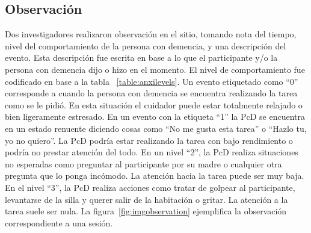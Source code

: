 	\subsection{Observaci\'on}
	Dos investigadores realizaron observaci\'on en el sitio, tomando nota del tiempo, nivel del comportamiento de la persona con demencia, y una descripci\'on del evento. Esta descripci\'on fue escrita en base a lo que el participante y/o la persona con demencia dijo o hizo en el momento. El nivel de comportamiento fue codificado en base a la tabla ~\ref{table:anxilevels}. Un evento etiquetado como ``0'' corresponde a cuando la persona con demencia se encuentra realizando la tarea como se le pidi\'o. En esta situaci\'on el cuidador puede estar totalmente relajado o bien ligeramente estresado. En un evento con la etiqueta ``1'' la PcD se encuentra en un estado renuente diciendo cosas como ``No me gusta esta tarea'' o ``Hazlo tu, yo no quiero''. La PcD podr\'ia estar realizando la tarea con bajo rendimiento o podr\'ia no prestar atenci\'on del todo. En un nivel ``2'', la PcD realiza situaciones no esperadas como preguntar al participante por su madre o cualquier otra pregunta que lo ponga inc\'omodo. La atenci\'on hacia la tarea puede ser muy baja. En el nivel ``3'', la PcD realiza acciones como tratar de golpear al participante, levantarse de la silla y querer salir de la habitaci\'on o gritar. La atenci\'on a la tarea suele ser nula. La figura~\ref{fig:imgobservation} ejemplifica la observaci\'on correspondiente a una sesi\'on.

